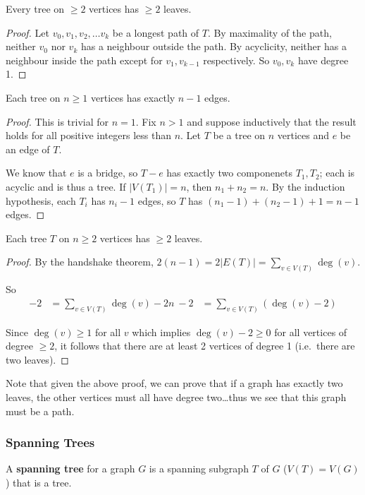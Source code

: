 \documentclass[12pt]{article}
\begin{document}
\begin{lemma}
Every tree on $\geq 2$ vertices has $\geq 2$ leaves.
\end{lemma}

\begin{proof}
Let $v_0, v_1, v_2, \dots v_k$ be a longest path of $T$. By maximality of the path, neither $v_0$ nor $v_k$ has a neighbour outside the path. By acyclicity, neither has a neighbour inside the path except for $v_1, v_{k-1}$ respectively. So $v_0, v_k$ have degree 1.
\end{proof}

\begin{lemma}
Each tree on $n \geq 1$ vertices has exactly $n-1$ edges.
\end{lemma}

\begin{proof}
This is trivial for $n=1$. Fix $n>1$ and suppose inductively that the result holds for all positive integers less than $n$. Let $T$ be a tree on $n$ vertices and $e$ be an edge of $T$.

We know that $e$ is a bridge, so $T-e$ has exactly two componenets $T_1, T_2$; each is acyclic and is thus a tree. If $|V(T_1)| = n$, then $n_1 + n_2 = n$. By the induction hypothesis, each $T_i$ has $n_i - 1$ edges, so $T$ has $(n_1 - 1) + (n_2 - 1) + 1 = n-1$ edges.
\end{proof}

\begin{lemma}
Each tree $T$ on $n \geq 2$ vertices has $\geq 2$ leaves.
\end{lemma}

\begin{proof}
By the handshake theorem, $2(n-1) = 2|E(T)| = \displaystyle\sum_{v\in V(T)} \deg(v)$.

So
\begin{align*}
-2 &= \sum_{v\in V(T)} \deg(v) - 2n\
-2 &= \sum_{v\in V(T)} (\deg(v) - 2)
\end{align*}

Since $\deg(v) \geq 1$ for all $v$ which implies $\deg(v) - 2 \geq 0$ for all vertices of degree $\geq 2$, it follows that there are at least 2 vertices of degree 1 (i.e.\ there are two leaves).
\end{proof}

Note that given the above proof, we can prove that if a graph has exactly two leaves, the other vertices must all have degree two\dots thus we see that this graph must be a path.

\subsubsection{Spanning Trees}
A {\bf spanning tree} for a graph $G$ is a spanning subgraph $T$ of $G$ ($V(T) = V(G)$) that is a tree.
\end{document}
